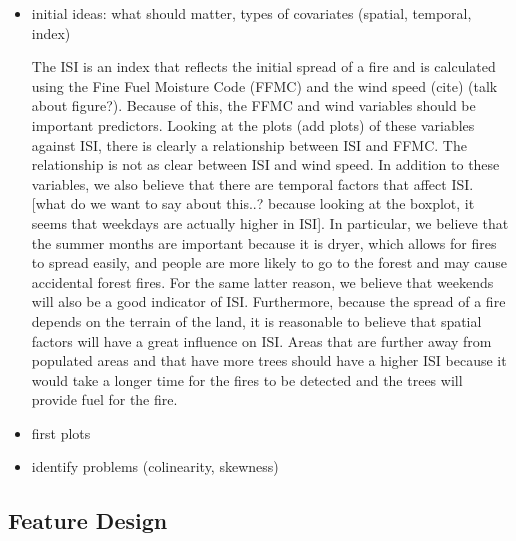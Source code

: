 \documentclass{article}
\begin{document}
\begin{itemize}

\item initial ideas: what should matter, types of covariates (spatial, temporal, index)
\par The ISI is an index that reflects the initial spread of a fire and is calculated using the Fine Fuel Moisture Code (FFMC) and the wind speed (cite) (talk about figure?). Because of this, the FFMC and wind variables should be important predictors. Looking at the plots (add plots) of these variables against ISI, there is clearly a relationship between ISI and FFMC. The relationship is not as clear between ISI and wind speed. In addition to these variables, we also believe that there are temporal factors that affect ISI. [what do we want to say about this..? because looking at the boxplot, it seems that weekdays are actually higher in ISI]. In particular, we believe that the summer months are important because it is dryer, which allows for fires to spread easily, and people are more likely to go to the forest and may cause accidental forest fires. For the same latter reason, we believe that weekends will also be a good indicator of ISI. Furthermore, because the spread of a fire depends on the terrain of the land, it is reasonable to believe that spatial factors will have a great influence on ISI. Areas that are further away from populated areas and that have more trees should have a higher ISI because it would take a longer time for the fires to be detected and the trees will provide fuel for the fire. 
\item first plots
\item identify problems (colinearity, skewness)

\end{itemize}

\subsection{Feature Design}\label{Engineering}
\end{document}
